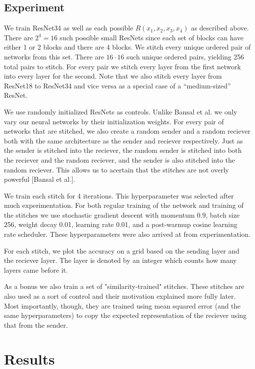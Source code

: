 \documentclass{article} %
\begin{document}
\subsection*{Experiment}
We train ResNet34 as well as each possible $R(x_1, x_2, x_3, x_4)$ as described above. There are $2^4 = 16$ such possible
small ResNets since each set of blocks can have either 1 or 2 blocks and there are 4 blocks. We stitch every unique ordered
pair of networks from this set. There are $16 \cdot 16$ such unique ordered pairs, yielding 256 total pairs to stitch.
For every pair we stitch every layer from the first network into every layer for the second. Note that we also stitch
every layer from ResNet18 to ResNet34 and vice versa as a special case of a ``medium-sized'' ResNet.

We use randomly initialized ResNets as controls. Unlike Bansal et al. we only vary our neural networks by their
initialization weights. For every pair of networks that are stitched, we also create a random sender and a random
reciever both with the same architecture as the sender and reciever respectively. Just as the sender is stitched
into the reciever, the random sender is stitched into both the reciever and the random reciever, and the sender
is also stitched into the random reciever. This allows us to acertain that the stitches
are not overly powerful [Bansal et al.].

We train each stitch for 4 iterations. This hyperparameter was selected after much experimentation. For both
regular training of the network and training of the stitches we use stochastic gradient descent with momentum 0.9,
batch size 256, weight decay 0.01, learning rate 0.01, and a post-warmup cosine learning rate scheduler.
 These hyperparameters were also arrived at from experimentation.

For each stitch, we plot the accuracy on a grid based on the sending layer and the reciever layer. The layer is
denoted by an integer which counts how many layers came before it.

As a bonus we also train a set of "similarity-trained" stitches. These stitches are also used as a sort of control and
their motivation explained more fully later. Most importantly, though, they are trained using mean squared error (and the
same hyperparameters) to copy the expected representation of the reciever using that from the sender.

\section*{Results}
\end{document}
